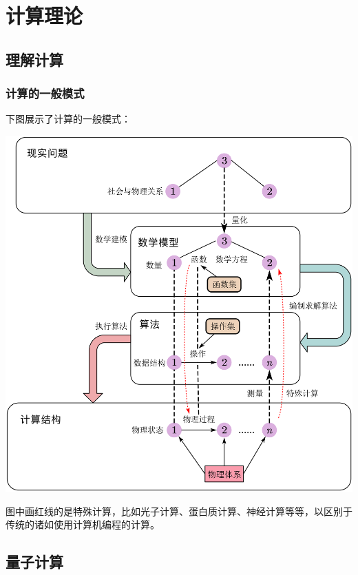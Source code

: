 \chapter{计算理论}

\section{理解计算}
\subsection{计算的一般模式}
下图展示了计算的一般模式：

\begin{center}
\includegraphics[width=14cm]{figure/General Computing.png}
\end{center}

图中画红线的是特殊计算，比如光子计算、蛋白质计算、神经计算等等，以区别于传统的诸如使用计算机编程的计算。


\section{量子计算}
